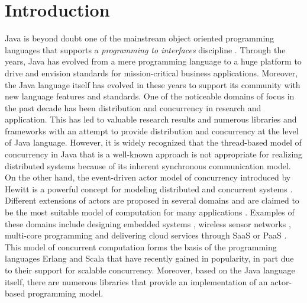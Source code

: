 \section{Introduction}
\label{sec:introduction}
Java is beyond doubt one of the mainstream object oriented programming languages 
that supports a \emph{programming to interfaces} discipline \cite{oop:patterns,oop:survey}.
Through the years, Java has evolved from a mere programming language to a huge platform to drive and envision standards for mission-critical business applications.
Moreover, the Java language itself has evolved in these years to support its community with new language features and standards.
One of the noticeable domains of focus in the past decade has been distribution and concurrency in research and application.
This has led to valuable research results and numerous libraries and frameworks with an attempt to provide distribution and concurrency at the level of Java language.
However, it is widely recognized that the thread-based model of concurrency in Java that is a well-known approach is not appropriate for realizing distributed systems because of its inherent synchronous communication model.
On the other hand, the event-driven actor model of concurrency introduced by Hewitt \cite{Hewitt69} is 
a powerful concept for modeling distributed and concurrent
systems \cite{Agha90,Agha97}. 
Different extensions of actors are proposed in several domains and are claimed to be the most suitable model of computation for many  applications \cite{Hewitt07-commitment}. 
Examples of these domains include designing embedded systems \cite{LeeACtorEmbedded03,LeeLN09}, 
wireless sensor networks \cite{CheongSensor05}, multi-core programming \cite{KarmaniSA09} 
and delivering cloud services through SaaS or PaaS \cite{Chang:DAIS07}.
This model of concurrent computation forms the basis of the
programming languages Erlang \cite{Armstrong10Erlang} and Scala
\cite{haller09tcs} that have recently gained in popularity, in part
due to their support for scalable concurrency.  Moreover, based on the
Java language itself, there are numerous libraries  that
provide  an implementation of an actor-based programming model.  

